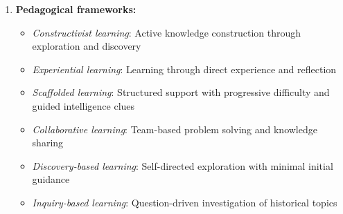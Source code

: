 \documentclass[a4paper,fleqn]{cas-sc}
\begin{document}
\begin{enumerate}[noitemsep]
\begin{itemize}[noitemsep]
 \item \textit{Location-based learning}: Physical movement through historical sites with GPS-triggered digital content \citep{40Kuran2018, 49Huizenga2007127, 54Gibson2007, 59Kee2014270, 80gottlieb2018your}
 
 \item \textit{Assessment-integrated learning}: Historical knowledge questions embedded as game challenges, with correct answers enabling progression \citep{1Barbatsis201159, 4Cruz2017, 5kazanidis2018alpha, 13Humpire2022, 24Ghannem2019, 39Tegos2014838, 52Lin2011265, 62Milosz201896, 63Liu2021, 73Wolfartsberger2011160, 79Fernes2024379}
\end{itemize}

	\item 
\textbf{Pedagogical frameworks:}
\begin{itemize}[noitemsep]
 \item \textit{Constructivist learning}: Active knowledge construction through exploration and discovery \citep{1Barbatsis201159, 3Watson2011466, 14Forsyth2023, 34Serrano2023, 61Karsenti202027, 72hutauruk2020utilization}
 
 \item \textit{Experiential learning}: Learning through direct experience and reflection \citep{1Barbatsis201159, 18Shih201054, 20Erandaru2014, 25Repantis2011502, 51Ardito2007, 58Shih2015173}
 
 \item \textit{Scaffolded learning}: Structured support with progressive difficulty and guided intelligence clues \citep{16Chen201447, 55Squire2004, 59Kee2014270, 64Hsu201324, 80gottlieb2018your}
 
 \item \textit{Collaborative learning}: Team-based problem solving and knowledge sharing \citep{6Czerwinski2018, 11Ternblad2023115, 17Manzanares2019, 29Stiso20201165, 40Kuran2018, 42Huffer201581, 47Clara2010156, 54Gibson2007, 59Kee2014270, 60Hoy2018, 62Milosz201896, 64Hsu201324, 70Hou201519, 71lynch2015pedagogical, 73Wolfartsberger2011160}
 
 \item \textit{Discovery-based learning}: Self-directed exploration with minimal initial guidance \citep{1Barbatsis201159, 39Tegos2014838, 59Kee2014270, 73Wolfartsberger2011160}
 
 \item \textit{Inquiry-based learning}: Question-driven investigation of historical topics \citep{23Zin2009322, 61Karsenti202027, 66Rahmawati2023163}
 

\end{itemize}
\end{enumerate}
\end{document}
